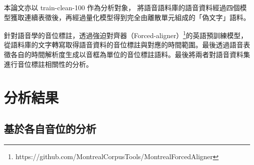         本論文亦以 train-clean-100 作為分析對象，
將語音語料庫的語音資料經過四個模型獲取連續表徵後，再經過量化模型得到完全由離散單元組成的「偽文字」語料。

        針對語音學的音位標註，透過強迫對齊器（Forced-aligner）\footnote{https://github.com/MontrealCorpusTools/Montreal­Forced­Aligner}的英語預訓練模型，從語料庫的文字轉寫取得語音資料的音位標註與對應的時間範圍。最後透過語音表徵各自的時間解析度生成以音框為單位的音位標註語料。最後將兩者對語音資料集進行音位標註相關性的分析。

\section{分析結果}


\subsection{基於各自音位的分析}

